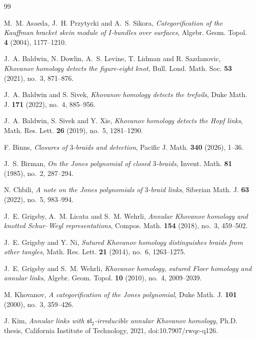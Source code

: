 \documentclass[11pt]{amsart}
\theoremstyle{remark}
\begin{document}
\begin{thebibliography}{99}

M.~M. Asaeda, J.~H. Przytycki and A.~S. Sikora,
\emph{Categorification of the Kauffman bracket skein module of \(I\)-bundles over surfaces},
Algebr. Geom. Topol. \textbf{4} (2004), 1177--1210.

J.~A. Baldwin, N. Dowlin, A.~S. Levine, T. Lidman and R. Sazdanovic,
\emph{Khovanov homology detects the figure-eight knot},
Bull. Lond. Math. Soc. \textbf{53} (2021), no.~3, 871--876.

J.~A. Baldwin and S. Sivek,
\emph{Khovanov homology detects the trefoils},
Duke Math. J. \textbf{171} (2022), no.~4, 885--956.

J.~A. Baldwin, S. Sivek and Y. Xie,
\emph{Khovanov homology detects the Hopf links},
Math. Res. Lett. \textbf{26} (2019), no.~5, 1281--1290.

F. Binns,
\emph{Closures of \(3\)-braids and detection},
Pacific J. Math. \textbf{340} (2026), 1--36.

J.~S. Birman,
\emph{On the Jones polynomial of closed \(3\)-braids},
Invent. Math. \textbf{81} (1985), no.~2, 287--294.

N. Chbili,
\emph{A note on the Jones polynomials of \(3\)-braid links},
Siberian Math. J. \textbf{63} (2022), no.~5, 983--994.

J.~E. Grigsby, A.~M. Licata and S.~M. Wehrli,
\emph{Annular Khovanov homology and knotted Schur--Weyl representations},
Compos. Math. \textbf{154} (2018), no.~3, 459--502.

J.~E. Grigsby and Y. Ni,
\emph{Sutured Khovanov homology distinguishes braids from other tangles},
Math. Res. Lett. \textbf{21} (2014), no.~6, 1263--1275.

J.~E. Grigsby and S.~M. Wehrli,
\emph{Khovanov homology, sutured Floer homology and annular links},
Algebr. Geom. Topol. \textbf{10} (2010), no.~4, 2009--2039.

M. Khovanov,
\emph{A categorification of the Jones polynomial},
Duke Math. J. \textbf{101} (2000), no.~3, 359--426.

J. Kim,
\emph{Annular links with \(\mathfrak{sl}_2\)-irreducible annular Khovanov homology},
Ph.D. thesis, California Institute of Technology, 2021,
{doi:10.7907/rwqc-q126}.


\end{thebibliography}
\end{document}
